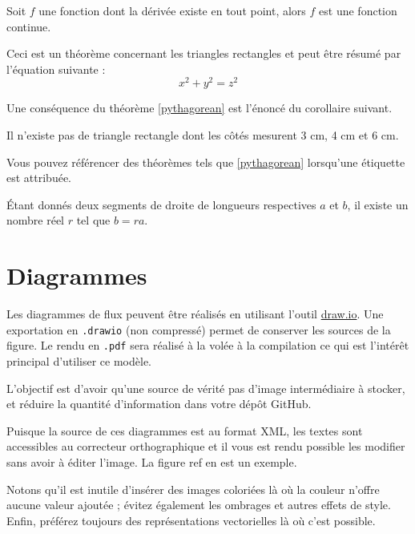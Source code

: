 \begin{theorem}
    Soit $f$ une fonction dont la dérivée existe en tout point, alors $f$ est une fonction continue.
\end{theorem}

\begin{theorem}
    \label{pythagorean}
    Ceci est un théorème concernant les triangles rectangles et peut être résumé par l'équation suivante :
    \[ x^2 + y^2 = z^2 \]
\end{theorem}

Une conséquence du théorème \ref{pythagorean} est l'énoncé du corollaire suivant.

\begin{corollary}
    Il n'existe pas de triangle rectangle dont les côtés mesurent 3 cm, 4 cm et 6 cm.
\end{corollary}

Vous pouvez référencer des théorèmes tels que \ref{pythagorean} lorsqu'une étiquette est attribuée.

\begin{lemma}
    Étant donnés deux segments de droite de longueurs respectives $a$ et $b$, il existe un nombre réel $r$ tel que $b = ra$.
\end{lemma}


\section{Diagrammes}

Les diagrammes de flux peuvent être réalisés en utilisant l'outil \href{https://app.diagrams.net/}{draw.io}. Une exportation en \texttt{.drawio} (non compressé) permet de conserver les sources de la figure. Le rendu en \texttt{.pdf} sera réalisé à la volée à la compilation ce qui est l'intérêt principal d'utiliser ce modèle.

L'objectif est d'avoir qu'une source de vérité \cad pas d'image intermédiaire à stocker, et réduire la quantité d'information dans votre dépôt GitHub.

Puisque la source de ces diagrammes est au format XML, les textes sont accessibles au correcteur orthographique et il vous est rendu possible les modifier sans avoir à éditer l'image. La figure ref en est un exemple.


Notons qu'il est inutile d'insérer des images coloriées là où la couleur n'offre aucune valeur ajoutée ; évitez également les ombrages et autres effets de style. Enfin, préférez toujours des représentations vectorielles là où c'est possible.

